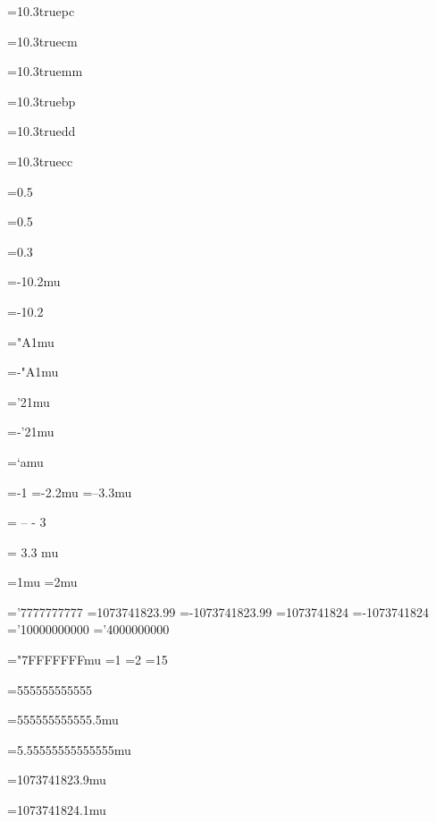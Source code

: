 =10.3truepc
\showthe{}

=10.3truecm
\showthe{}

=10.3truemm
\showthe{}

=10.3truebp
\showthe{}

=10.3truedd
\showthe{}

=10.3truecc
\showthe{}

=0.5
\showthe{}

=0.5
\showthe{}

=0.3
\showthe{}

=-10.2mu
\showthe{}

=-10.2
\showthe{}

="A1mu
\showthe{}

=-"A1mu
\showthe{}

='21mu
\showthe{}

=-'21mu
\showthe{}

=`amu
\showthe{}

=-1
\showthe{}
=-2.2mu
\showthe{}
=--3.3mu
\showthe{}

  =  -- - 3  
\showthe{}

 = 3.3  mu
\showthe{}

=1mu
=2mu

='7777777777
\showthe{}
=1073741823.99
\showthe{}
=-1073741823.99
\showthe{}
=1073741824
\showthe{}
=-1073741824
\showthe{}
='10000000000
\showthe{}
='4000000000
\showthe{}

="7FFFFFFFmu
=1
\showthe{}
=2
\showthe{}
=15
\showthe{}

=555555555555
\showthe{}

=555555555555.5mu
\showthe{}

=5.55555555555555mu
\showthe{}

=1073741823.9mu
\showthe{}

=1073741824.1mu
\showthe{}

